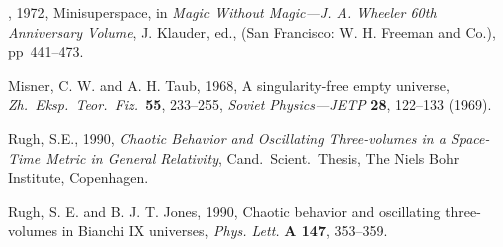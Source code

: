 \begin{references}
\bibitem{}\dash, 1972, Minisuperspace, in {\em Magic Without
Magic---J. A. Wheeler 60th Anniversary Volume}, J. Klauder, ed., (San
Francisco: W. H. Freeman and Co.), pp~441--473.

\bibitem{}Misner, C. W. and A. H. Taub, 1968, A singularity-free
empty universe,
{\em Zh.\ Eksp.\ Teor.\ Fiz.\ }{\bf 55}, 233--255,
{\em Soviet Physics---JETP} {\bf 28}, 122--133 (1969).

\bibitem{}Rugh, S.E., 1990,
{\em Chaotic Behavior and Oscillating Three-volumes in a Space-Time
Metric in General Relativity},  Cand.\ Scient.\ Thesis, The Niels
Bohr Institute, Copenhagen.

\bibitem{}Rugh, S. E. and B. J. T. Jones, 1990,
Chaotic behavior and oscillating three-volumes in Bianchi IX universes,
{\em Phys. Lett.} {\bf A 147}, 353--359.

\end{references}





